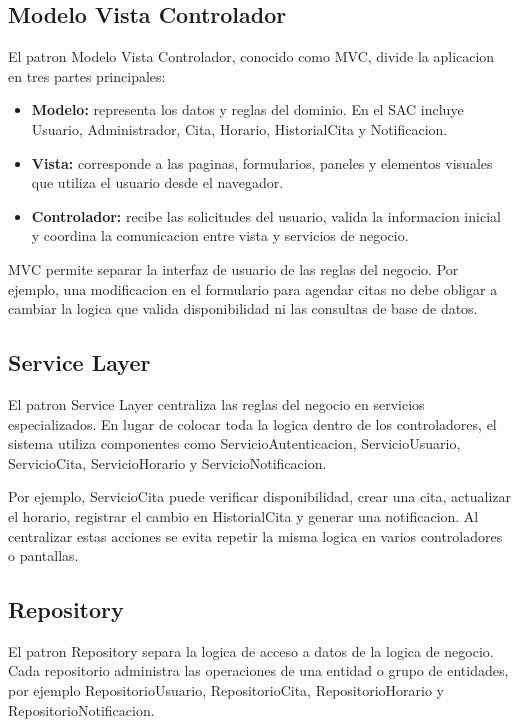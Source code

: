 \documentclass[12pt,letterpaper]{article}
\begin{document}
\subsection{Modelo Vista Controlador}

El patron Modelo Vista Controlador, conocido como MVC, divide la aplicacion en tres partes principales:

\begin{itemize}[leftmargin=1.2cm]
    \item \textbf{Modelo:} representa los datos y reglas del dominio. En el SAC incluye Usuario, Administrador, Cita, Horario, HistorialCita y Notificacion.
    \item \textbf{Vista:} corresponde a las paginas, formularios, paneles y elementos visuales que utiliza el usuario desde el navegador.
    \item \textbf{Controlador:} recibe las solicitudes del usuario, valida la informacion inicial y coordina la comunicacion entre vista y servicios de negocio.
\end{itemize}

MVC permite separar la interfaz de usuario de las reglas del negocio. Por ejemplo, una modificacion en el formulario para agendar citas no debe obligar a cambiar la logica que valida disponibilidad ni las consultas de base de datos.

\subsection{Service Layer}

El patron Service Layer centraliza las reglas del negocio en servicios especializados. En lugar de colocar toda la logica dentro de los controladores, el sistema utiliza componentes como ServicioAutenticacion, ServicioUsuario, ServicioCita, ServicioHorario y ServicioNotificacion.

Por ejemplo, ServicioCita puede verificar disponibilidad, crear una cita, actualizar el horario, registrar el cambio en HistorialCita y generar una notificacion. Al centralizar estas acciones se evita repetir la misma logica en varios controladores o pantallas.

\subsection{Repository}

El patron Repository separa la logica de acceso a datos de la logica de negocio. Cada repositorio administra las operaciones de una entidad o grupo de entidades, por ejemplo RepositorioUsuario, RepositorioCita, RepositorioHorario y RepositorioNotificacion.
\end{document}
